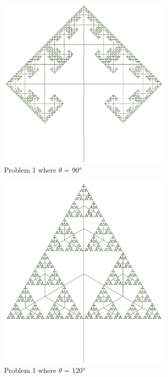 \begin{figure}[H]
    \centering
    \noindent\includegraphics[width=0.75\textwidth]{figures/L-systems/prob1-90}
    \caption{Problem 1 where $\theta$ = 90°}
    \label{fig:prob1_90}
\end{figure}

\begin{figure}[H]
    \centering
    \noindent\includegraphics[width=0.75\textwidth]{figures/L-systems/prob1-120}
    \caption{Problem 1 where $\theta$ = 120°}
    \label{fig:prob1_120}
\end{figure}


